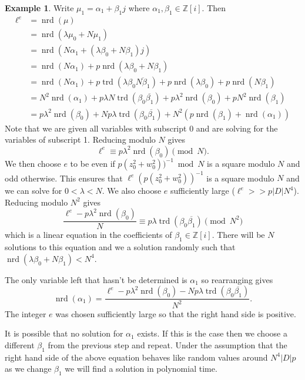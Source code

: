\documentclass[10pt]{article}
\theoremstyle{plain}
\theoremstyle{definition}
\newtheorem{example}[theorem]{Example}
\newcommand{\op}{\operatorname}
\newcommand{\Z}{\mathbb{Z}}
\newcommand{\nrd}{\op{nrd}}
\newcommand{\trd}{\op{trd}}
\begin{document}
\begin{example}
    Write \( \mu_1 = \alpha_1 + \beta_1j \) where \( \alpha_1, \beta_1 \in \Z[i] \).
    Then
    \begin{align*}
        \ell^e
          & = \nrd(\mu)                                                                                                      \\
          & = \nrd(\lambda \mu_0 + N \mu_1)                                                                                  \\
          & = \nrd(N\alpha_1 + (\lambda\beta_0 + N\beta_1)j)                                                                 \\
          & = \nrd(N\alpha_1) +p\nrd(\lambda\beta_0 + N\beta_1)                                                              \\
          & = \nrd(N\alpha_1) + p\trd(\lambda \beta_0\overline{N\beta_1}) + p\nrd(\lambda\beta_0) + p\nrd(N\beta_1)          \\
          & = N^2\nrd(\alpha_1) +  p\lambda N \trd(\beta_0\overline{\beta_1}) + p\lambda^2 \nrd(\beta_0) + pN^2\nrd(\beta_1) \\
          & = p\lambda^2 \nrd(\beta_0) + Np\lambda \trd(\beta_0\overline{\beta_1}) + N^2(p\nrd(\beta_1) + \nrd(\alpha_1))
    \end{align*}
    Note that we are given all variables with subscript 0 and are solving for the variables of subscript 1.
    Reducing modulo \( N \) gives
    \[
        \ell^e \equiv p\lambda^2\nrd(\beta_0) \pmod{N}.
    \]
    We then choose \( e \) to be even if \( p(z_0^2 + w_0^2))^{-1} \bmod{N} \) is a square modulo \( N \) and odd otherwise.
    This ensures that \( \ell^e(p(z_0^2 + w_0^2))^{-1} \) is a square modulo \( N \) and we can solve for \( 0 <  \lambda < N\).
    We also choose \( e \) sufficiently large (\( \ell^e >> p|D|N^4 \)).
    Reducing modulo \( N^2 \) gives
    \[
        \frac{\ell^e - p\lambda^2\nrd(\beta_0)}{N}\equiv p\lambda \trd(\beta_0\overline{\beta_1}) \pmod{N^2}
    \]
    which is a linear equation in the coefficients of \( \beta_1 \in \Z[i]\).
    There will be \( N \) solutions to this equation and we a solution randomly such that \( \nrd(\lambda\beta_0 + N\beta_1) < N^4 \).

    The only variable left that hasn't be determined is \( \alpha_1 \) so rearranging gives
    \[
        \nrd(\alpha_1) = \frac{\ell^e - p\lambda^2 \nrd(\beta_0) - Np\lambda \trd(\beta_0\overline{\beta_1})}{N^2}.
    \]
    The integer \( e \) was chosen sufficiently large so that the right hand side is positive.

    It is possible that no solution for \( \alpha_1 \) exists.
    If this is the case then we choose a different \( \beta_1 \) from the previous step and repeat.
    Under the assumption that the right hand side of the above equation behaves like random values around \( N^4|D|p \) as we change \( \beta_1 \) we will find a solution in polynomial time.
\end{example}
\end{document}
